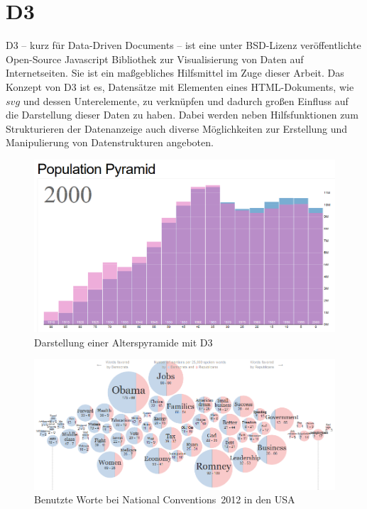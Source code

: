 \section{D3}\label{sec:framework}
D3 -- kurz für Data-Driven Documents -- ist eine unter BSD-Lizenz veröffentlichte Open-Source Javascript Bibliothek zur Visualisierung von Daten auf Internetseiten. Sie ist ein maßgebliches Hilfsmittel im Zuge dieser Arbeit. Das Konzept von D3 ist es, Datensätze mit Elementen eines HTML-Dokuments, wie $svg$ und dessen Unterelemente, zu verknüpfen und dadurch großen Einfluss auf die Darstellung dieser Daten zu haben. Dabei werden neben Hilfsfunktionen zum Strukturieren der Datenanzeige auch diverse Möglichkeiten zur Erstellung und Manipulierung von Datenstrukturen angeboten. 
\begin{figure}
	\centering
	\includegraphics[width=.8\linewidth]{../screenshots/population_d3.PNG}
	\caption{Darstellung einer Alterspyramide mit D3}
	\label{abb:pyramid}
\end{figure}
\begin{figure}
	\centering
	\includegraphics[width=.8\linewidth]{../screenshots/ny_times_d3.PNG}
	\caption{Benutzte Worte bei \glqq National Conventions\grqq\ 2012 in den USA}
	\label{abb:nytimes}
\end{figure}

